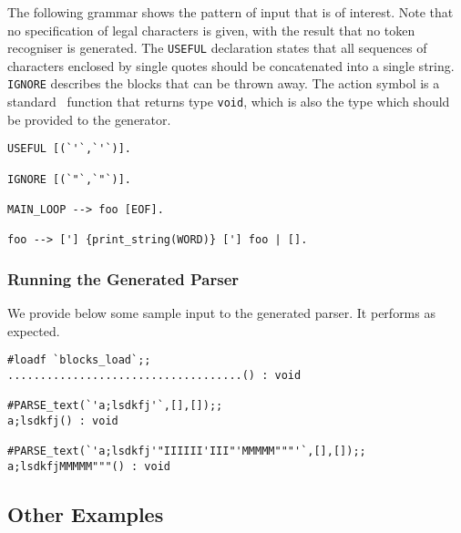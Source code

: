 The following grammar shows the pattern of input that is of interest.  Note
that no specification of legal characters is given, with the result that no
token recogniser is generated.  The 
\verb"USEFUL" declaration states that
all sequences of characters enclosed by single quotes should be concatenated
into a single string.  
\verb"IGNORE" describes the blocks that can 
be thrown
away.  The action symbol is a standard \ML\ function that returns type 
\verb"void", which is also the type which should be provided to the generator.
\begin{center}
\begin{boxed}
\begin{verbatim}
USEFUL [(`'`,`'`)].

IGNORE [(`"`,`"`)].

MAIN_LOOP --> foo [EOF].

foo --> ['] {print_string(WORD)} ['] foo | [].
\end{verbatim}
\end{boxed}
\end{center}

\subsubsection{Running the Generated Parser}

We provide below some sample input to the generated parser.  It performs
as expected.
\setcounter{sessioncount}{1}
\begin{center}
\begin{session}
\begin{verbatim}
#loadf `blocks_load`;;
....................................() : void

#PARSE_text(`'a;lsdkfj'`,[],[]);;
a;lsdkfj() : void

#PARSE_text(`'a;lsdkfj'"IIIIII'III"'MMMMM"""'`,[],[]);;
a;lsdkfjMMMMM"""() : void
\end{verbatim}
\end{session}
\end{center}

\subsection{Other Examples}

